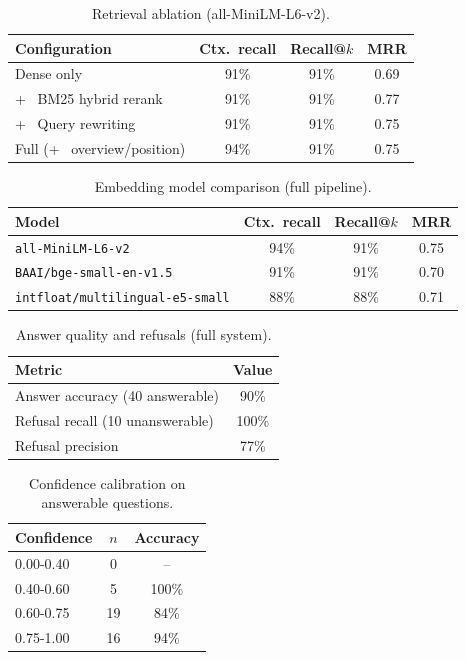 \begin{table}[t]\centering\caption{Retrieval ablation (all-MiniLM-L6-v2).}\label{tab:ablation}
\begin{tabular}{lccc}\hline Configuration & Ctx.\ recall & Recall@$k$ & MRR \\ \hline
Dense only & 91\% & 91\% & 0.69 \\
+~ BM25 hybrid rerank & 91\% & 91\% & 0.77 \\
+~ Query rewriting & 91\% & 91\% & 0.75 \\
Full (+~ overview/position) & 94\% & 91\% & 0.75 \\
\hline\end{tabular}\end{table}

\begin{table}[t]\centering\caption{Embedding model comparison (full pipeline).}\label{tab:embeddings}
\begin{tabular}{lccc}\hline Model & Ctx.\ recall & Recall@$k$ & MRR \\ \hline
\texttt{all-MiniLM-L6-v2} & 94\% & 91\% & 0.75 \\
\texttt{BAAI/bge-small-en-v1.5} & 91\% & 91\% & 0.70 \\
\texttt{intfloat/multilingual-e5-small} & 88\% & 88\% & 0.71 \\
\hline\end{tabular}\end{table}

\begin{table}[t]\centering\caption{Answer quality and refusals (full system).}\label{tab:answers}
\begin{tabular}{lc}\hline Metric & Value \\ \hline
Answer accuracy (40 answerable) & 90\% \\
Refusal recall (10 unanswerable) & 100\% \\
Refusal precision & 77\% \\
\hline\end{tabular}\end{table}

\begin{table}[t]\centering\caption{Confidence calibration on answerable questions.}\label{tab:calibration}
\begin{tabular}{lcc}\hline Confidence & $n$ & Accuracy \\ \hline
0.00-0.40 & 0 & – \\
0.40-0.60 & 5 & 100\% \\
0.60-0.75 & 19 & 84\% \\
0.75-1.00 & 16 & 94\% \\
\hline\end{tabular}\end{table}

